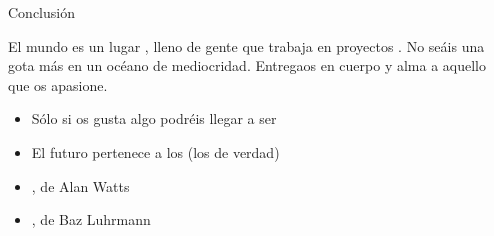 \documentclass[14pt]{beamer}
\newcommand{\WebLink}[2]{
  \href{#1}{\structure{\ding{43}~\color{sail-green}{#2}}}
}
\begin{document}
\begin{frame}{Conclusión}
    \begin{block}{} \centering
      \normalsize El mundo es un lugar , lleno
      de gente  que trabaja en proyectos
      . No seáis una gota más en un océano de
      mediocridad. Entregaos en cuerpo y alma a aquello que os
      apasione.
    \end{block}

    \begin{itemize} \itemsep0em
      \item Sólo si os gusta algo podréis llegar a ser
      \item El futuro pertenece a los {\bf {}} (los de verdad)
      \item \WebLink{https://vimeo.com/65666763}
                    {What if Money Did not Matter?}, de Alan Watts
      \item \WebLink{https://www.youtube.com/watch?v=rAn4gZCd4HY}
                    {Everybody's Free To Wear Sunscreen}, de Baz Luhrmann
    \end{itemize}
\end{frame}
\end{document}
